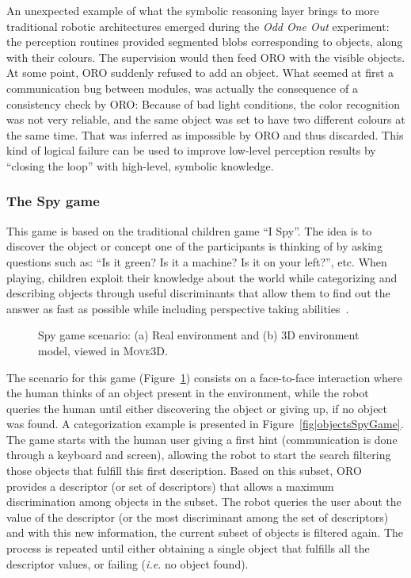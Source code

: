 An unexpected example of what the symbolic reasoning layer brings to more
traditional robotic architectures emerged during the \emph{Odd One Out}
experiment: the perception routines provided segmented blobs corresponding to
objects, along with their colours. The supervision would then feed ORO with the
visible objects. At some point, ORO suddenly refused to add an object. What
seemed at first a communication bug between modules, was actually the
consequence of a consistency check by ORO: Because of bad light conditions, the
color recognition was not very reliable, and the same object was set to have
two different colours at the same time. That was inferred as impossible by ORO
and thus discarded. This kind of logical failure can be used to improve
low-level perception results by ``closing the loop'' with high-level, symbolic
knowledge.


\subsubsection{The Spy game}
\label{spygame}

This game is based on the traditional children game ``I Spy''. The idea is to
discover the object or concept one of the participants is thinking of by asking
questions such as: ``Is it green? Is it a machine? Is it on your left?'', etc.
When playing, children exploit their knowledge about the world while
categorizing and describing objects through useful discriminants that allow
them to find out the answer as fast as possible while including perspective
taking abilities~\cite{Moll2006}.

\begin{figure}
\centering

\caption{Spy game scenario: (a) Real environment and (b) 3D environment model, viewed in \textsc{Move3D}.}
\label{fig|spyGameScenario}
\end{figure}

The scenario for this game (Figure~\ref{fig|spyGameScenario}) consists on a
face-to-face interaction where the human thinks of an object present in the
environment, while the robot queries the human until either discovering the
object or giving up, if no object was found. A categorization example is
presented in Figure~\ref{fig|objectsSpyGame}. The game starts with the human
user giving a first hint (communication is done through a keyboard and screen),
allowing the robot to start the search filtering those objects that fulfill
this first description. Based on this subset, ORO provides a descriptor (or set
of descriptors) that allows a maximum discrimination among objects in the
subset. The robot queries the user about the value of the descriptor (or the
most discriminant among the set of descriptors) and with this new information,
the current subset of objects is filtered again. The process is repeated until
either obtaining a single object that fulfills all the descriptor values, or
failing (\textit{i.e.} no object found). 

